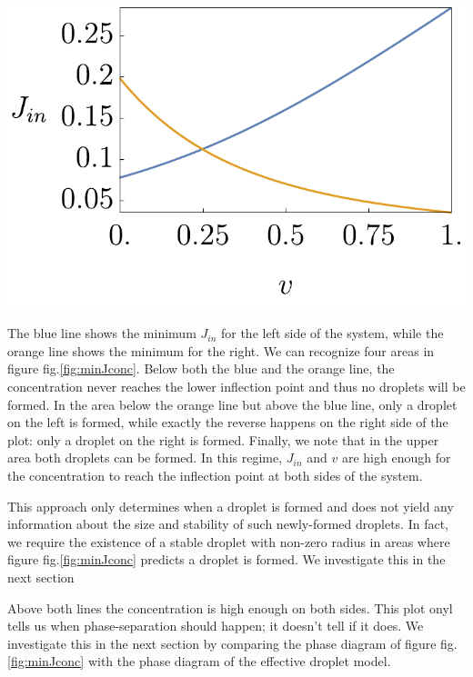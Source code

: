 \documentclass{Dissertate}
\let\origfigure\figure
\let\endorigfigure\endfigure
\renewenvironment{figure}[1][2] {
    \expandafter\origfigure\expandafter[H]
} {
    \endorigfigure
}
\begin{document}
\begin{figure}
\hypertarget{fig:minJconc}{%
\centering
\includegraphics{source/figures/pdf/Jmin.pdf}
\caption{Blue line: Minimum J left side. Orange line: minimum J right
side.}\label{fig:minJconc}
}
\end{figure}

The blue line shows the minimum \(J_{in}\) for the left side of the
system, while the orange line shows the minimum for the right. We can
recognize four areas in figure fig.\ref{fig:minJconc}. Below both the
blue and the orange line, the concentration never reaches the lower
inflection point and thus no droplets will be formed. In the area below
the orange line but above the blue line, only a droplet on the left is
formed, while exactly the reverse happens on the right side of the plot:
only a droplet on the right is formed. Finally, we note that in the
upper area both droplets can be formed. In this regime, \(J_{in}\) and
\(v\) are high enough for the concentration to reach the inflection
point at both sides of the system.

This approach only determines when a droplet is formed and does not
yield any information about the size and stability of such newly-formed
droplets. In fact, we require the existence of a stable droplet with
non-zero radius in areas where figure fig.\ref{fig:minJconc} predicts a
droplet is formed. We investigate this in the next section

Above both lines the concentration is high enough on both sides. This
plot onyl tells us when phase-separation should happen; it doesn't tell
if it does. We investigate this in the next section by comparing the
phase diagram of figure fig.\ref{fig:minJconc} with the phase diagram
of the effective droplet model.
\end{document}
